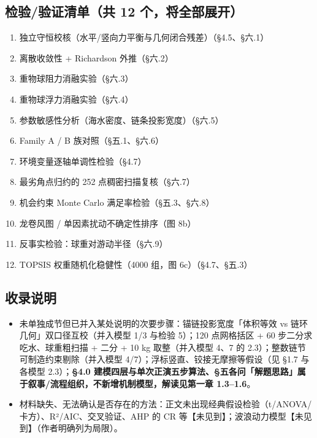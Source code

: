 \documentclass[UTF8,a4paper,zihao=-4]{ctexart}
\begin{document}
\subsection{\texorpdfstring{检验/验证清单（共 12 个，将全部展开）}{检验/验证清单（共 12 个，将全部展开）}}

\begin{enumerate}[leftmargin=1.8em]
\item 独立守恒校核（水平/竖向力平衡与几何闭合残差）（§4.5、§六.1）
\item 离散收敛性 + Richardson 外推（§六.2）
\item 重物球阻力消融实验（§六.3）
\item 重物球浮力消融实验（§六.4）
\item 参数敏感性分析（海水密度、链条投影宽度）（§六.5）
\item Family A / B 族对照（§五.1、§六.6）
\item 环境变量逐轴单调性检验（§4.7）
\item 最劣角点归约的 252 点稠密扫描复核（§六.7）
\item 机会约束 Monte Carlo 满足率检验（§五.3、§六.8）
\item 龙卷风图 / 单因素扰动不确定性排序（图 8b）
\item 反事实检验：球重对游动半径（§六.9）
\item TOPSIS 权重随机化稳健性（4000 组，图 6c）（§4.7、§五.3）
\end{enumerate}

\subsection{\texorpdfstring{收录说明}{收录说明}}

\begin{itemize}[leftmargin=1.5em]
\item 未单独成节但已并入某处说明的次要步骤：锚链投影宽度「体积等效 vs 链环几何」双口径互校（并入模型 1/3 与检验 5）；120 点网格括区 + 60 步二分求吃水、球重粗扫描 + 二分 + 10 kg 取整（并入模型 4、7 的 2.3）；整数链节可制造约束剔除（并入模型 4/7）；浮标竖直、铰接无摩擦等假设（见 §1.7 与各模型 2.3）；\textbf{§4.0 建模四层与单次正演五步算法、§五各问「解题思路」属于叙事/流程组织，不新增机制模型，解读见第一章 1.3--1.6}。
\item 材料缺失、无法确认是否存在的方法：正文未出现经典假设检验（t/ANOVA/卡方）、R²/AIC、交叉验证、AHP 的 CR 等【未见到】；波浪动力模型【未见到】（作者明确列为局限）。
\end{itemize}
\end{document}
